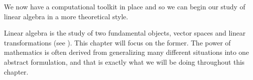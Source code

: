 \begin{para}We now have a computational toolkit in place and so we can begin our study of linear algebra in a more theoretical style.\end{para}
%
\begin{para}Linear algebra is the study of two fundamental objects, vector spaces and linear transformations (see ).  This chapter will focus on the former.  The power of mathematics is often derived from generalizing many different situations into one abstract formulation, and that is exactly what we will be doing throughout this chapter.\end{para}

